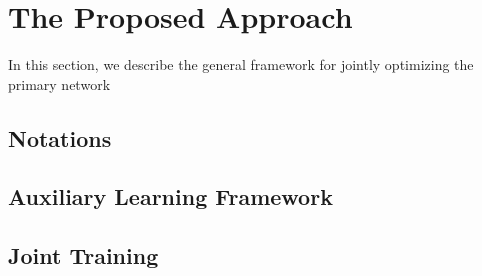 
\section{The Proposed Approach}
In this section, we describe the general framework for jointly optimizing the primary network

\subsection{Notations}


\subsection{Auxiliary Learning Framework}


\subsection{Joint Training}
